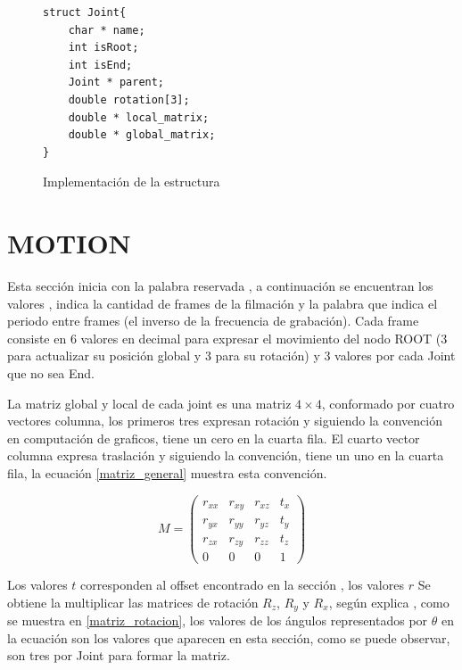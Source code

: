 \begin{figure}
    \centering
    \begin{verbatim}
struct Joint{
    char * name;
    int isRoot;
    int isEnd;
    Joint * parent;
    double rotation[3];
    double * local_matrix;
    double * global_matrix;
}
    \end{verbatim}
    \caption{Implementación de la estructura }
    \label{code:joint}
\end{figure}

\section{MOTION}

Esta sección inicia con la palabra reservada , a continuación se encuentran los valores , indica la cantidad de frames de la filmación y la palabra  que indica el periodo entre frames (el inverso de la frecuencia de grabación). Cada frame consiste en 6 valores en decimal para expresar el movimiento del nodo ROOT (3 para actualizar su posición global y 3 para su rotación) y 3 valores por cada Joint que no sea End. 

La matriz global y local de cada joint es una matriz $4 \times 4$, conformado por cuatro vectores columna, los primeros tres expresan rotación y siguiendo la convención en computación de graficos, tiene un cero en la cuarta fila. El cuarto vector columna expresa traslación y siguiendo la convención, tiene un uno en la cuarta fila, la ecuación \eqref{matriz_general} muestra esta convención.

\begin{equation}\label{matriz_general}
M = 
    \begin{pmatrix}
    r_{xx} & r_{xy} & r_{xz} & t_x \\
    r_{yx} & r_{yy} & r_{yz} & t_y \\
    r_{zx} & r_{zy} & r_{zz} & t_z \\
    0      & 0      & 0      & 1 
    \end{pmatrix}
\end{equation}

Los valores $t$ corresponden al offset encontrado en la sección , los valores $r$ Se obtiene la multiplicar las matrices de rotación $R_z$, $R_y$ y $R_x$, según explica \cite{andreas}, como se muestra en \eqref{matriz_rotacion}, los valores de los ángulos representados por $\theta$ en la ecuación son los valores que aparecen en esta sección, como se puede observar, son tres por Joint para formar la matriz. 

